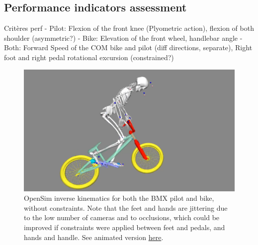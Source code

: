 \subsection{Performance indicators assessment}
Critères perf
- Pilot: Flexion of the front knee (Plyometric action), flexion of both shoulder (asymmetric?)
- Bike: Elevation of the front wheel, handlebar angle
- Both: Forward Speed of the COM bike and pilot (diff directions, separate), Right foot and right pedal rotational excursion (constrained?) %


\begin{figure}[hbtp]
	\centering
	\def\svgwidth{1\columnwidth}
	\fontsize{10pt}{10pt}\selectfont
	\includegraphics[width=\linewidth]{"../Chap7/Figures/BMXPilot.png"}
	\caption{OpenSim inverse kinematics for both the BMX pilot and bike, without constraints. Note that the feet and hands are jittering due to the low number of cameras and to occlusions, which could be improved if constraints were applied between feet and pedals, and hands and handle. See animated version \href{https://github.com/perfanalytics/pose2sim/blob/main/Content/Activities_verylow.gif}{here}.}
	\label{fig_bmxpilot}
\end{figure}




